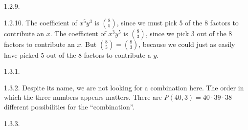 \begin {itemize}
\begin{ans}{1.2.9.}
\end{ans}
\begin{ans}{1.2.10.}
		The coefficient of $x^5y^3$ is ${8\choose 5}$, since we must pick 5 of the 8 factors to contribute an $x$.  The coefficient of $x^3y^5$ is ${8 \choose 3}$, since we pick 3 out of the 8 factors to contribute an $x$.  But ${8 \choose 5} = {8\choose 3}$, because we could just as easily have picked 5 out of the 8 factors to contribute a $y$.
	
\end{ans}
\protect \end {itemize}
 \protect {} \protect \begin {itemize} 
\begin{ans}{1.3.1.}
  
\end{ans}
\begin{ans}{1.3.2.}
	Despite its name, we are not looking for a combination here.  The order in which the three numbers appears matters.  There are $P(40,3) = 40\cdot 39 \cdot 38$ different possibilities for the ``combination''.
\end{ans}
\begin{ans}{1.3.3.}
\end{ans}
\end{itemize}
